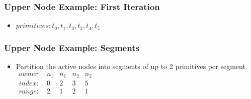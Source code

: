 \documentclass{beamer}
\newcommand{\drawTri}[3]{
  \draw[fill=lightgray, drop shadow, rounded corners=0mm] (#1) -- (#2) -- (#3) -- (#1);
}
\newcommand{\drawSplit}[2]{
  \draw[dashed,line width=0.75pt] (#1) -- (#2);
}
\newcommand{\axes}[2]{
  \draw[->] (0,0) -- coordinate (x axis mid) (#1,0);
  \draw[->] (0,0) -- coordinate (y axis mid) (0,#2);
  \foreach \x in {0,2,...,#1}
            \draw (\x,1pt) -- (\x,-3pt)
		    node[anchor=north] {\x};
  \foreach \y in {0,2,...,#2}
     	    \draw (1pt,\y) -- (-3pt,\y) 
     		    node[anchor=east] {\y}; 

}
\newcommand{\scene}{
  \axes{11}{9}

  \drawTri{0,6}{2,8}{2,4}
  \draw (1.33,6.5) node {0};
  \drawTri{2,6}{4,8}{2,8}
  \draw (2.66,7.33) node {1};
  \drawTri{2,6}{4,4}{2,4}
  \draw (2.67,4.67) node {3};

  \drawTri{7,8}{7,4}{9,4}
  \draw (7.67,5.33) node {2};
  \drawTri{9,0}{10,2}{6,3}
  \draw (8.33,1.66) node {4};
  \drawTri{6,3}{6,1}{8,1}
  \draw (6.67,1.67) node {5};
}
\begin{document}
\begin{frame}
  \frametitle{Upper Node Example: First Iteration}
  \begin{minipage}{0.4\textwidth}
  \end{minipage}
  \begin{minipage}{0.5\textwidth}
    \centering
  \end{minipage}
  \vspace{10pt}
  \begin{itemize}
    \item[] $primitives: t_0, t_1, t_3, t_2, t_4, t_5$
  \end{itemize}
\end{frame}

\begin{frame}
  \frametitle{Upper Node Example: Segments}
  \begin{itemize}
  \item Partition the active nodes into segments of up to 2 primitives per
    segment.\\
    $\begin{array}{lcccc}
      owner: & n_1 & n_1 & n_2 & n_2 \\
      index: & 0 & 2 & 3 & 5 \\
      range: & 2 & 1 & 2 & 1 \\
    \end{array}$
  \end{itemize}
\end{frame}
\end{document}
